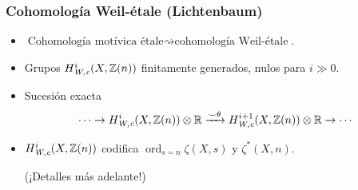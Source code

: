 \documentclass[handout]{beamer}
\newcommand{\FF}{\mathbb{F}}
\newcommand{\RR}{\mathbb{R}}
\newcommand{\ZZ}{\mathbb{Z}}
\DeclareMathOperator{\Gal}{Gal}
\DeclareMathOperator{\ord}{ord}
\newcommand{\et}{\text{\it ét}}
\newcommand{\Wc}{\text{\it W,c}}
\begin{document}

\begin{frame}
  \frametitle{Cohomología Weil-étale (Lichtenbaum)}

  \begin{itemize}
  \item $\text{Cohomología motívica étale} \rightsquigarrow
    \text{cohomología Weil-étale}$.

  \item Grupos $H^i_\Wc (X,\ZZ(n))$ finitamente generados, nulos para
    $i \gg 0$.

  \item Sucesión exacta
    $$\cdots \to H^i_\Wc (X,\ZZ(n)) \otimes \RR \xrightarrow{\smile\theta} H^{i+1}_\Wc (X,\ZZ(n)) \otimes \RR \to \cdots$$

  \item $H^i_\Wc (X, \ZZ(n))$ codifica $\ord_{s=n} \zeta (X,s)$ y $\zeta^* (X,n)$.

    (¡Detalles más adelante!)



  \end{itemize}
\end{frame}

\end{document}
